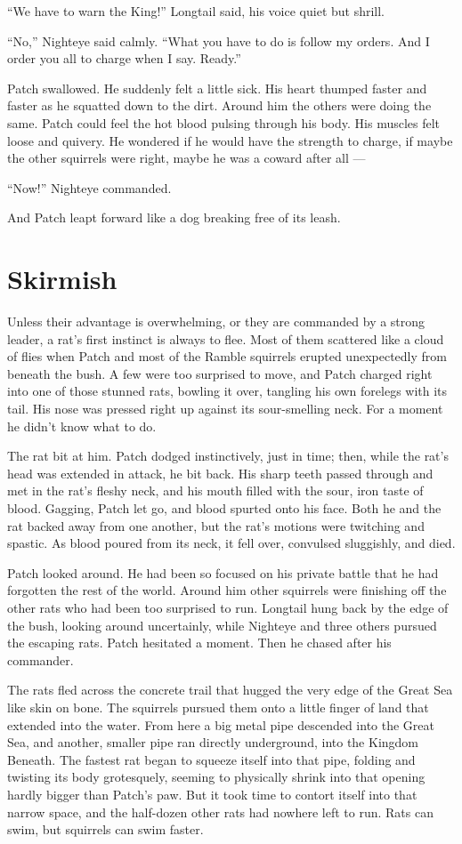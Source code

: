 \documentclass[ebook,oneside,openany,17pt]{memoir}
\renewcommand{\thechapter}{\Roman{chapter}}
\newcounter{sections}
\newcommand{\sections}[1]{%
  \section*{#1}
  \addtocounter{sections}{1}%
  \pdfbookmark[1]{#1}{section.\thechapter.\thesections}}
\begin{document}
“We have to warn the King!” Longtail said, his voice quiet but shrill.

“No,” Nighteye said calmly. “What you have to do is follow my
orders. And I order you all to charge when I say. Ready.”

Patch swallowed. He suddenly felt a little sick. His heart thumped
faster and faster as he squatted down to the dirt. Around him the
others were doing the same. Patch could feel the hot blood pulsing
through his body. His muscles felt loose and quivery. He wondered if
he would have the strength to charge, if maybe the other squirrels
were right, maybe he was a coward after all —

“Now!” Nighteye commanded.

And Patch leapt forward like a dog breaking free of its leash.


\sections{Skirmish}

Unless their advantage is overwhelming, or they are commanded by a
strong leader, a rat’s first instinct is always to flee. Most of them
scattered like a cloud of flies when Patch and most of the Ramble
squirrels erupted unexpectedly from beneath the bush. A few were too
surprised to move, and Patch charged right into one of those stunned
rats, bowling it over, tangling his own forelegs with its tail. His
nose was pressed right up against its sour-smelling neck. For a moment
he didn’t know what to do.

The rat bit at him. Patch dodged instinctively, just in time; then,
while the rat’s head was extended in attack, he bit back. His sharp
teeth passed through and met in the rat’s fleshy neck, and his mouth
filled with the sour, iron taste of blood. Gagging, Patch let go, and
blood spurted onto his face. Both he and the rat backed away from one
another, but the rat’s motions were twitching and spastic. As blood
poured from its neck, it fell over, convulsed sluggishly, and died.

Patch looked around. He had been so focused on his private battle that
he had forgotten the rest of the world. Around him other squirrels
were finishing off the other rats who had been too surprised to
run. Longtail hung back by the edge of the bush, looking around
uncertainly, while Nighteye and three others pursued the escaping
rats. Patch hesitated a moment. Then he chased after his commander.

The rats fled across the concrete trail that hugged the very edge of
the Great Sea like skin on bone. The squirrels pursued them onto a
little finger of land that extended into the water. From here a big
metal pipe descended into the Great Sea, and another, smaller pipe ran
directly underground, into the Kingdom Beneath. The fastest rat began
to squeeze itself into that pipe, folding and twisting its body
grotesquely, seeming to physically shrink into that opening hardly
bigger than Patch’s paw. But it took time to contort itself into that
narrow space, and the half-dozen other rats had nowhere left to
run. Rats can swim, but squirrels can swim faster.
\end{document}
